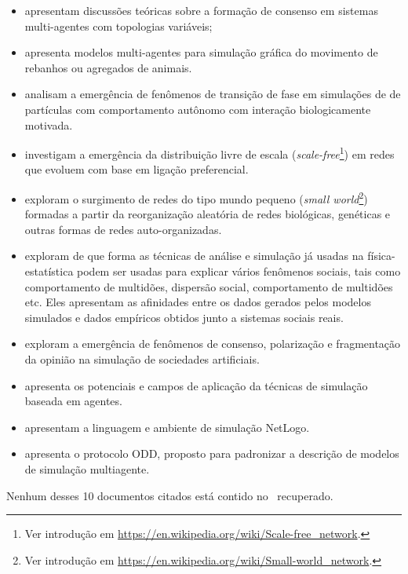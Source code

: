 \begin{itemize}
    \item  \cite{olfati-saber_consensus_2004} apresentam discussões teóricas sobre a formação de consenso em sistemas multi-agentes com topologias variáveis;
    \item  \cite{reynolds_flocks_1987} apresenta modelos multi-agentes para simulação gráfica do movimento de rebanhos ou agregados de animais.
    \item \cite{vicsek_novel_1995} analisam a emergência de fenômenos de transição de fase em simulações de de partículas com comportamento autônomo com interação biologicamente motivada.
    \item \cite{barabasi_emergence_1999} investigam a emergência da distribuição livre de escala (\textit{scale-free}\footnote{Ver introdução em \url{https://en.wikipedia.org/wiki/Scale-free_network}.}) em redes que evoluem com base em ligação preferencial.
    \item \cite{watts_collective_1998} exploram o surgimento de redes do tipo mundo pequeno (\textit{small world}\footnote{Ver introdução em \url{https://en.wikipedia.org/wiki/Small-world_network}.}) formadas a partir da reorganização aleatória de redes biológicas, genéticas e outras formas de redes auto-organizadas.
    \item \cite{castellano_statistical_2009} exploram de que forma as técnicas de análise e simulação já usadas na física-estatística podem ser usadas para explicar vários fenômenos sociais, tais como comportamento de multidões, dispersão social, comportamento de multidões etc. Eles apresentam as afinidades entre os dados gerados pelos modelos simulados e dados empíricos obtidos junto a sistemas sociais reais. 
    \item \cite{hegselmann_opinion_2002} exploram a emergência de fenômenos de consenso, polarização e fragmentação da opinião na simulação de sociedades artificiais.
    \item \cite{bonabeau_agent-based_2002} apresenta os potenciais e campos de aplicação da técnicas de simulação baseada em agentes.
    \item \cite{wilensky_netlogo_1999} apresentam a linguagem e ambiente de simulação NetLogo.
    \item \cite{grimm_standard_2006} apresenta o protocolo ODD, proposto para padronizar a descrição de modelos de simulação multiagente.
\end{itemize}

Nenhum desses 10 documentos citados está contido no \dataset\   recuperado.


